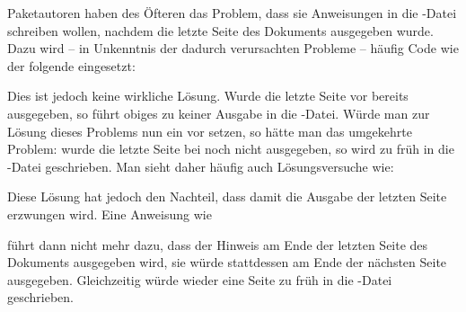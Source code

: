 \begin{Declaration}
\end{Declaration}
%
Paketautoren haben des Öfteren das Problem, dass sie Anweisungen in die
-Datei schreiben wollen, nachdem die letzte Seite des Dokuments
ausgegeben wurde. Dazu wird -- in Unkenntnis der dadurch verursachten Probleme
-- häufig Code wie der folgende eingesetzt:
\begin{lstcode}[escapechar=\$]
  \AtEndDocument{%
    \if@filesw
      \write\@auxout{\protect\writethistoaux}%
    \fi
  }
\end{lstcode}
Dies ist jedoch keine wirkliche Lösung. Wurde die letzte
Seite vor  bereits ausgegeben, so führt obiges
zu keiner Ausgabe in die -Datei. Würde man zur Lösung dieses
Problems nun ein  vor  setzen, so hätte man das
umgekehrte Problem: wurde die letzte Seite bei
 noch nicht ausgegeben, so wird
 zu früh in die -Datei geschrieben. Man sieht
daher häufig auch Lösungsversuche wie:
\begin{lstcode}[escapechar=\$]
  \AtEndDocument{%
    \if@filesw
      \clearpage
      \immediate\write\@auxout{\protect\writethistoaux}%
    \fi
  }
\end{lstcode}
Diese Lösung hat jedoch den Nachteil, dass damit die Ausgabe der letzten Seite
erzwungen wird. Eine Anweisung wie
\begin{lstcode}
\end{lstcode}
führt dann nicht mehr dazu, dass der Hinweis am Ende der letzten Seite des
Dokuments ausgegeben wird, sie würde stattdessen am Ende der nächsten Seite
ausgegeben. Gleichzeitig würde  wieder eine Seite zu
früh in die -Datei geschrieben.

